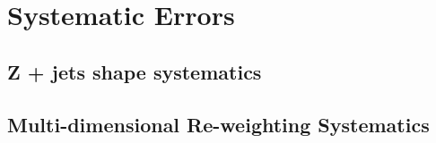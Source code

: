 \chapter{Systematic Errors}%
\label{ch:systematics}
\section{Z + jets shape systematics}
\label{sec:zjets-shapes}
\section{Multi-dimensional Re-weighting Systematics}%
\label{sec:bdtr}

